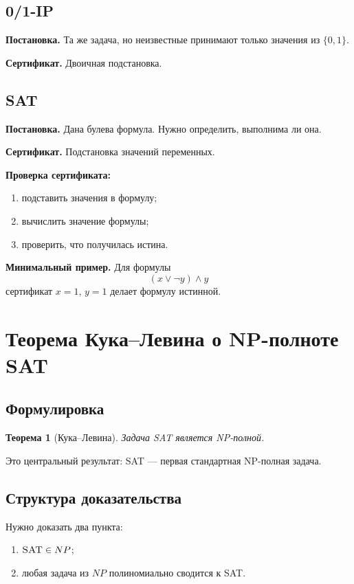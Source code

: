 \documentclass[12pt,a4paper]{article}
\theoremstyle{definition}
\theoremstyle{plain}
\newtheorem{theorem}{Теорема}[section]
\begin{document}
\subsection{\textsc{0/1-IP}}
\textbf{Постановка.} Та же задача, но неизвестные принимают только значения из $\{0,1\}$.

\textbf{Сертификат.} Двоичная подстановка.

\subsection{\textsc{SAT}}
\textbf{Постановка.} Дана булева формула. Нужно определить, выполнима ли она.

\textbf{Сертификат.} Подстановка значений переменных.

\textbf{Проверка сертификата:}
\begin{enumerate}
\item подставить значения в формулу;
\item вычислить значение формулы;
\item проверить, что получилась истина.
\end{enumerate}

\textbf{Минимальный пример.}
Для формулы
\[
(x\vee \neg y)\wedge y
\]
сертификат $x=1$, $y=1$ делает формулу истинной.

\section{Теорема Кука--Левина о NP-полноте \texorpdfstring{\textsc{SAT}}{SAT}}

\subsection{Формулировка}
\begin{theorem}[Кука--Левина]
Задача \textsc{SAT} является NP-полной.
\end{theorem}

Это центральный результат: \textsc{SAT} --- первая стандартная NP-полная задача.

\subsection{Структура доказательства}
Нужно доказать два пункта:
\begin{enumerate}
\item $\textsc{SAT}\in NP$;
\item любая задача из $NP$ полиномиально сводится к \textsc{SAT}.
\end{enumerate}
\end{document}
